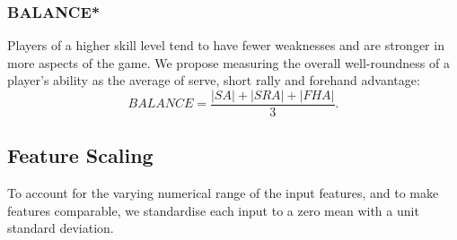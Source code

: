 \subsubsection*{BALANCE*} \label{sec:balance}

Players of a higher skill level tend to have fewer weaknesses and are stronger in more aspects of the game. We propose measuring the overall well-roundness of a player's ability as the average of serve, short rally and forehand advantage:
\begin{equation}
    \textit{BALANCE} = \frac{|\textit{SA}|+|\textit{SRA}|+|\textit{FHA}|}{3}.
\end{equation}

\subsection{Feature Scaling}
To account for the varying numerical range of the input features, and to make features comparable, we standardise each input to a zero mean with a unit standard deviation.
